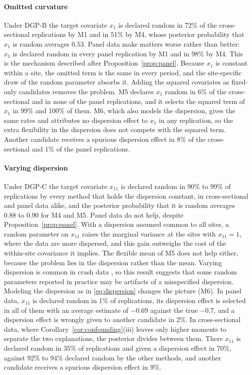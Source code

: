 \paragraph{Omitted curvature} Under DGP-B the target covariate $x_1$ is declared random in 72\% of the cross-sectional replications by M1 and in 51\% by M4, whose posterior probability that $x_1$ is random averages $0.53$. Panel data make matters worse rather than better: $x_1$ is declared random in every panel replication by M1 and in 98\% by M4. This is the mechanism described after Proposition~\ref{prop:panel}. Because $x_1$ is constant within a site, the omitted term is the same in every period, and the site-specific draw of the random parameter absorbs it. Adding the squared covariates as fixed-only candidates removes the problem. M5 declares $x_1$ random in 6\% of the cross-sectional and in none of the panel replications, and it selects the squared term of $x_1$ in 99\% and 100\% of them. M6, which also models the dispersion, gives the same rates and attributes no dispersion effect to $x_1$ in any replication, so the extra flexibility in the dispersion does not compete with the squared term. Another candidate receives a spurious dispersion effect in 8\% of the cross-sectional and 1\% of the panel replications.

\paragraph{Varying dispersion} Under DGP-C the target covariate $x_{11}$ is declared random in 90\% to 99\% of replications by every method that holds the dispersion constant, in cross-sectional and panel data alike, and the posterior probability that it is random averages $0.88$ to $0.90$ for M4 and M5. Panel data do not help, despite Proposition~\ref{prop:panel}. With a dispersion assumed common to all sites, a random parameter on $x_{11}$ raises the marginal variance at the sites with $x_{11}=1$, where the data are more dispersed, and this gain outweighs the cost of the within-site covariance it implies. The flexible mean of M5 does not help either, because the problem lies in the dispersion rather than the mean. Varying dispersion is common in crash data \citep{miaou2003modeling}, so this result suggests that some random parameters reported in practice may be artifacts of a misspecified dispersion. Modeling the dispersion as in \eqref{eq:dispersion} changes the picture (M6). In panel data, $x_{11}$ is declared random in 1\% of replications, its dispersion effect is selected in all of them with an average estimate of $-0.69$ against the true $-0.7$, and a dispersion effect is wrongly given to another candidate in 2\%. In cross-sectional data, where Corollary~\ref{cor:confounding}(iii) leaves only higher moments to separate the two explanations, the posterior divides between them. There $x_{11}$ is declared random in 35\% of replications and given a dispersion effect in 70\%, against 92\% to 94\% declared random by the other methods, and another candidate receives a spurious dispersion effect in 9\%.

